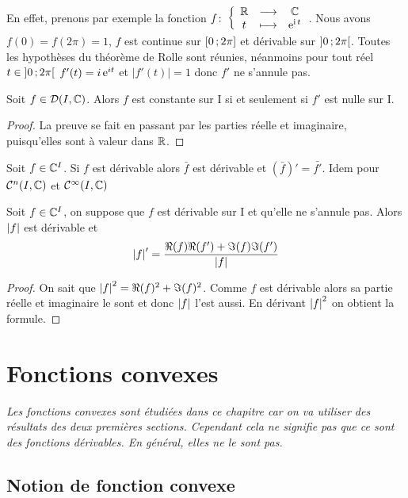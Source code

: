 En effet, prenons par exemple la fonction \(f\colon\left\{\begin{array}{ccc}\mathbb{R} & \longrightarrow &\mathbb{C}\\t & \longmapsto & \operatorname{e}^{\operatorname{i}
t}\end{array}\right.\). Nous avons \(f(0)=f(2\pi)=1\), \(f\) est continue sur 
\(\left[ 0 \, ; {} 2\pi \right]\) et dérivable sur \(\left] 0 \, ; {} 2\pi \right[\). Toutes les hypothèses
du théorème de Rolle sont réunies, néanmoins pour tout réel
\(t \in \left] 0 \, ; {} 2\pi \right[\) \(f'(t)=i \operatorname{e}^{it}\) et \(|f'(t)|=1\) donc
\(f'\) ne s'annule pas.

\begin{theo}
  Soit \(f \in \mathcal{D}(I,\mathbb{C})\). Alors \(f\) est constante sur I si et seulement
  si \(f'\) est nulle sur I.
\end{theo}
\begin{proof}
  La preuve se fait en passant par les parties réelle et imaginaire,
  puisqu'elles sont à valeur dans \(\mathbb{R}\).
\end{proof}
\begin{prop}
  Soit \(f \in \mathbb{C}^I\). Si \(f\) est dérivable alors \(\bar{f}\) est dérivable et
  \(\left(\bar{f}\right)'=\bar{f'}\). Idem pour \(\mathcal{C}^{n}(I,\mathbb{C})\) et
  \(\mathcal{C}^{\infty}(I,\mathbb{C})\)
\end{prop}
\begin{prop}
  Soit \(f \in \mathbb{C}^I\), on suppose que \(f\) est dérivable sur I et qu'elle ne
  s'annule pas. Alors \(\left\lvert f\right\rvert\) est dérivable et
  \begin{equation}
    \left\lvert f\right\rvert'=\frac{\Re(f)\Re(f') + \Im(f)\Im(f')}{\left\lvert f\right\rvert}
  \end{equation}
\end{prop}
\begin{proof}
  On sait que \(\left\lvert f\right\rvert^2=\Re(f)^2+\Im(f)^2\). Comme \(f\) est dérivable alors
  sa partie réelle et imaginaire le sont et donc \(\left\lvert f\right\rvert\) l'est aussi. En
  dérivant \(\left\lvert f\right\rvert^2\) on obtient la formule.
\end{proof}

\section{Fonctions convexes}

\emph{Les fonctions convexes sont étudiées dans ce chapitre car on va utiliser
des résultats des deux premières sections. Cependant cela ne signifie pas que ce
sont des fonctions dérivables. En général, elles ne le sont pas.}

\subsection{Notion de fonction convexe}

